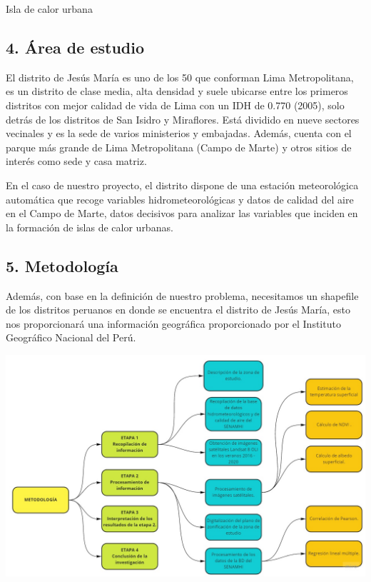 \documentclass[
]{article}
\begin{document}
Isla de calor urbana

\hypertarget{uxe1rea-de-estudio}{%
\subsection{4. Área de estudio}\label{uxe1rea-de-estudio}}

El distrito de Jesús María es uno de los 50 que conforman Lima
Metropolitana, es un distrito de clase media, alta densidad y suele
ubicarse entre los primeros distritos con mejor calidad de vida de Lima
con un IDH de 0.770 (2005), solo detrás de los distritos de San Isidro y
Miraflores. Está dividido en nueve sectores vecinales y es la sede de
varios ministerios y embajadas. Además, cuenta con el parque más grande
de Lima Metropolitana (Campo de Marte) y otros sitios de interés como
sede y casa matriz.

En el caso de nuestro proyecto, el distrito dispone de una estación
meteorológica automática que recoge variables hidrometeorológicas y
datos de calidad del aire en el Campo de Marte, datos decisivos para
analizar las variables que inciden en la formación de islas de calor
urbanas.

\hypertarget{metodologuxeda}{%
\subsection{5. Metodología}\label{metodologuxeda}}

Además, con base en la definición de nuestro problema, necesitamos un
shapefile de los distritos peruanos en donde se encuentra el distrito de
Jesús María, esto nos proporcionará una información geográfica
proporcionado por el Instituto Geográfico Nacional del Perú.

\begin{center}\includegraphics{Img/Metodologia} \end{center}
\end{document}
